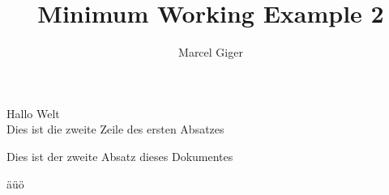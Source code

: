 \documentclass[12pt,a4paper]{article}
\author{Marcel Giger}
\title{Minimum Working Example 2}
\begin{document}
\maketitle
Hallo Welt\\
Dies ist die zweite Zeile des ersten Absatzes

Dies ist der zweite Absatz dieses Dokumentes

äüö
\end{document}
